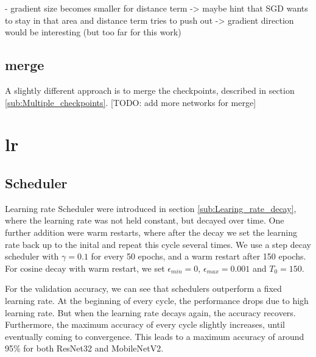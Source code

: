 - gradient size becomes smaller for distance term -> maybe hint that SGD wants
to stay in that area and distance term tries to push out -> gradient direction
would be interesting (but too far for this work)

\subsection{merge}
A slightly different approach is to merge the checkpoints, described in section
\ref{sub:Multiple_checkpoints}.
[TODO: add more networks for merge]










\section{lr}\label{res:Learning_rate}
\subsection{Scheduler}\label{res:Scheduler}
Learning rate Scheduler were introduced in section \ref{sub:Learing_rate_decay},
where the learning rate was not held constant, but decayed over time. One
further addition were warm restarts, where after the decay we set the learning
rate back up to the inital and repeat this cycle several times. We use a step
decay scheduler with $\gamma = 0.1$ for every 50 epochs, and a warm restart
after 150 epochs. For cosine decay with warm restart, we set $\epsilon_{min}=0$,
$\epsilon_{max}=0.001$ and $T_0=150$.


For the validation accuracy, we can see that schedulers outperform a fixed
learning rate. At the beginning of every cycle, the performance drops due to
high learning rate. But when the learning rate decays again, the accuracy
recovers. Furthermore, the maximum accuracy of every cycle slightly increases,
until eventually coming to convergence. This leads to a maximum accuracy of
around 95\% for both ResNet32 and MobileNetV2.


